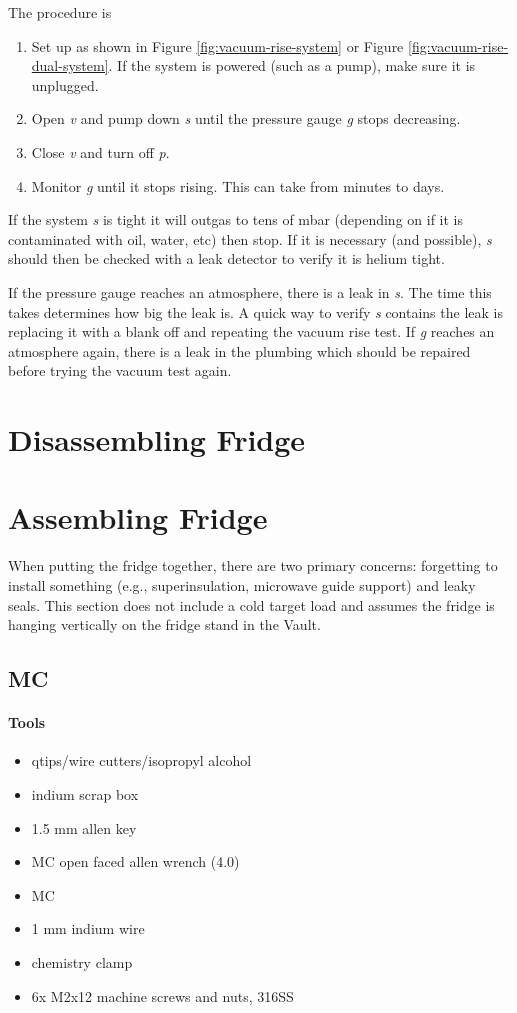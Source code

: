 The procedure is
\begin{enumerate}
 \item Set up as shown in Figure \ref{fig:vacuum-rise-system} or Figure \ref{fig:vacuum-rise-dual-system}.  If the system is powered (such as a pump), make sure it is unplugged.
 \item Open \textit{v} and pump down \textit{s} until the pressure gauge \textit{g} stops decreasing.
 \item Close \textit{v} and turn off \textit{p}.
 \item Monitor \textit{g} until it stops rising.  This can take from minutes to days.
\end{enumerate}

If the system \textit{s} is tight it will outgas to tens of mbar (depending on if it is contaminated with oil, water, etc) then stop.  If it is necessary (and possible), \textit{s} should then be checked with a leak detector to verify it is helium tight.

If the pressure gauge reaches an atmosphere, there is a leak in \textit{s}.  The time this takes determines how big the leak is.  A quick way to verify \textit{s} contains the leak is replacing it with a blank off and repeating the vacuum rise test.  If \textit{g} reaches an atmosphere again, there is a leak in the plumbing which should be repaired before trying the vacuum test again.

\section{Disassembling Fridge}

\section{Assembling Fridge}

When putting the fridge together, there are two primary concerns: forgetting to install something (e.g., superinsulation, microwave guide support) and leaky seals.  This section does not include a cold target load and assumes the fridge is hanging vertically on the fridge stand in the Vault.

\subsection{MC}
\paragraph{Tools}
\begin{itemize}
 \item qtips/wire cutters/isopropyl alcohol
\item indium scrap box
\item 1.5 mm allen key
\item MC open faced allen wrench (4.0)
\item MC
\item 1 mm indium wire
\item chemistry clamp
\item 6x M2x12 machine screws and nuts, 316SS
\end{itemize}

